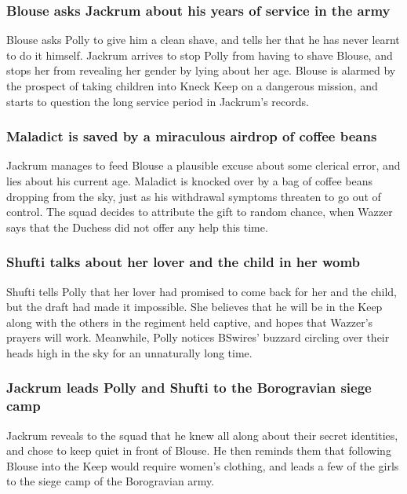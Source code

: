 \subsubsection{\Gls{Blouse} asks \Gls{Jackrum} about his years of service in the army}
\Gls{Blouse} asks \Gls{Polly} to give him a clean shave, and tells her that he has never learnt to
do it himself. \Gls{Jackrum} arrives to stop \Gls{Polly} from having to shave \Gls{Blouse}, and
stops her from revealing her gender by lying about her age. \Gls{Blouse} is alarmed by the prospect
of taking children into Kneck Keep on a dangerous mission, and starts to question the long service
period in \Gls{Jackrum}'s records.

\subsubsection{\Gls{Maladict} is saved by a miraculous airdrop of coffee beans}
\Gls{Jackrum} manages to feed \Gls{Blouse} a plausible excuse about some clerical error, and lies
about his current age. \Gls{Maladict} is knocked over by a bag of coffee beans dropping from the
sky, just as his withdrawal symptoms threaten to go out of control. The squad decides to attribute
the gift to random chance, when \Gls{Wazzer} says that the \Gls{Duchess} did not offer any help this
time.

\subsubsection{\Gls{Shufti} talks about her lover and the child in her womb}
\Gls{Shufti} tells \Gls{Polly} that her lover had promised to come back for her and the child, but
the draft had made it impossible. She believes that he will be in the Keep along with the others in
the regiment held captive, and hopes that \Gls{Wazzer}'s prayers will work. Meanwhile, \Gls{Polly}
notices \Gls{BSwires}' buzzard circling over their heads high in the sky for an unnaturally long
time.

\subsubsection{\Gls{Jackrum} leads \Gls{Polly} and \Gls{Shufti} to the Borogravian siege camp}
\Gls{Jackrum} reveals to the squad that he knew all along about their secret identities, and chose
to keep quiet in front of \Gls{Blouse}. He then reminds them that following \Gls{Blouse} into the
Keep would require women's clothing, and leads a few of the girls to the siege camp of the
Borogravian army.

